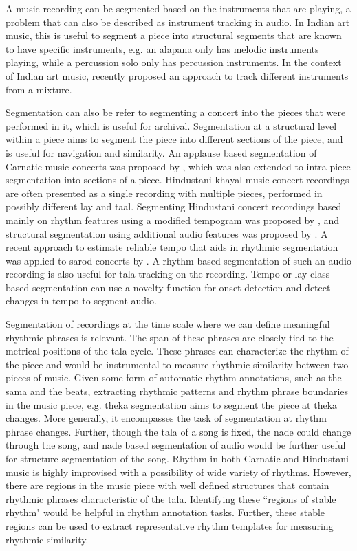 A music recording can be segmented based on the instruments that are playing, a problem that can also be described as instrument tracking in audio. In Indian art music, this is useful to segment a piece into structural segments that are known to have specific instruments, e.g. an \gls{alapana} only has melodic instruments playing, while a percussion solo only has percussion instruments. In the context of Indian art music,  recently proposed an approach to track different instruments from a mixture. 

Segmentation can also be refer to segmenting a concert into the pieces that were performed in it, which is useful for archival. Segmentation at a structural level within a piece aims to segment the piece into different sections of the piece, and is useful for navigation and similarity. An applause based segmentation of Carnatic music concerts was proposed by , which was also extended to intra-piece segmentation into sections of a piece. Hindustani \gls{khayal} music concert recordings are often presented as a single recording with multiple pieces, performed in possibly different \gls{lay} and \gls{taal}. Segmenting Hindustani concert recordings based mainly on rhythm features using a modified tempogram was proposed by , and structural segmentation using additional audio features was proposed by . A recent approach to estimate reliable tempo that aids in rhythmic segmentation was applied to \gls{sarod} concerts by . A rhythm based segmentation of such an audio recording is also useful for \gls{tala} tracking on the recording. Tempo or \gls{lay} class based segmentation can use a novelty function for onset detection and detect changes in tempo to segment audio.

Segmentation of recordings at the time scale where we can define meaningful rhythmic phrases is relevant. The span of these phrases are closely tied to the metrical positions of the \gls{tala} cycle. These phrases can characterize the rhythm of the piece and would be instrumental to measure rhythmic similarity between two pieces of music. Given some form of automatic rhythm annotations, such as the sama and the beats, extracting rhythmic patterns and rhythm phrase boundaries in the music piece, e.g. \gls{theka} segmentation aims to segment the piece at \gls{theka} changes. More generally, it encompasses the task of segmentation at rhythm phrase changes. Further, though the \gls{tala} of a song is fixed, the \gls{nade} could change through the song, and \gls{nade} based segmentation of audio would be further useful for structure segmentation of the song. Rhythm in both Carnatic and Hindustani music is highly improvised with a possibility of wide variety of rhythms. However, there are regions in the music piece with well defined structures that contain rhythmic phrases characteristic of the \gls{tala}. Identifying these ``regions of stable rhythm" would be helpful in rhythm annotation tasks. Further, these stable regions can be used to extract representative rhythm templates for measuring rhythmic similarity. 
%
